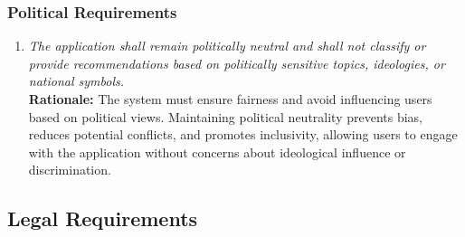 \documentclass[]{article}
\begin{document}
\subsubsection{Political Requirements}
\label{ssub:political_requirements}
\begin{enumerate}[{CP-P}1. ]
	\item \textit{The application shall remain politically neutral and shall not classify or provide recommendations based on politically sensitive topics, ideologies, or national symbols.}
	\\ \textbf{Rationale:} The system must ensure fairness and avoid influencing users based on political views. Maintaining political neutrality prevents bias, reduces potential conflicts, and promotes inclusivity, allowing users to engage with the application without concerns about ideological influence or discrimination.
\end{enumerate}


\subsection{Legal Requirements}
\label{sub:legal_requirements}
\end{document}
